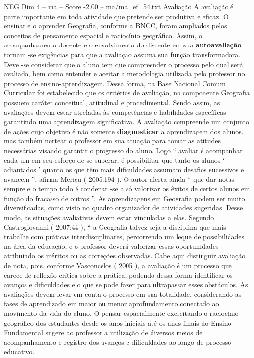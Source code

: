 \begin{textsample}{NEG Dim 4 – ma – Score -2.00 – ma/ma\_ef\_54.txt}  \label{ex:f4_neg_239}
Avaliação A avaliação é parte importante em toda atividade que pretende ser produtiva e eficaz.
O ensinar e o aprender Geografia, conforme a BNCC, foram ampliados pelos conceitos de pensamento espacial e raciocínio geográfico.
Assim, o acompanhamento docente e o envolvimento do discente em sua \textbf{autoavaliação} tornam -se exigências para que a avaliação assuma sua função transformadora.
Deve -se considerar que o aluno tem que compreender o processo pelo qual será avaliado, bem como entender e aceitar a metodologia utilizada pelo professor no processo de ensino-aprendizagem.
Dessa forma, na Base Nacional Comum Curricular foi estabelecido que os critérios de avaliação, no componente Geografia possuem caráter conceitual, atitudinal e procedimental.
Sendo assim, as avaliações devem estar atreladas às competências e habilidades específicas garantindo uma aprendizagem significativa.
A avaliação compreende um conjunto de ações cujo objetivo é não somente \textbf{diagnosticar} a aprendizagem dos alunos, mas também nortear o professor em sua atuação para tomar as atitudes necessárias visando garantir o progresso do aluno.
Logo “ avaliar é acompanhar cada um em seu esforço de se superar, é possibilitar que tanto os alunos ‘ adiantados ’ quanto os que têm mais dificuldades assumam desafios sucessivos e avancem ”, afirma Merieu ( 2005:194 ).
O autor alerta ainda “ que dar notas sempre e o tempo todo é condenar -se a só valorizar os êxitos de certos alunos em função do fracasso de outros ”.
As aprendizagens em Geografia podem ser muito diversificadas, como visto no quadro organizador de atividades sugeridas.
Desse modo, as situações avaliativas devem estar vinculadas a elas.
Segundo Castrogiovanni ( 2007:44 ), “ a Geografia talvez seja a disciplina que mais trabalhe com práticas interdisciplinares, percorrendo um leque de possibilidades na área da educação, e o professor deverá valorizar essas oportunidades atribuindo os méritos ou as correções observadas.
Cabe aqui distinguir avaliação de nota, pois, conforme Vasconcelos ( 2005 ), a avaliação é um processo que carece de reflexão crítica sobre a prática, podendo dessa forma identificar os avanços e dificuldades e o que se pode fazer para ultrapassar esses obstáculos.
As avaliações devem levar em conta o processo em sua totalidade, considerando as fases de aprendizado em maior ou menor aprofundamento conectado ao movimento da vida do aluno.
O pensar espacialmente exercitando o raciocínio geográfico dos estudantes desde os anos iniciais até os anos finais do Ensino Fundamental sugere ao professor a utilização de diversos meios de acompanhamento e registro dos avanços e dificuldades ao longo do processo educativo.

\end{textsample}
